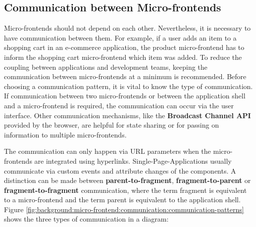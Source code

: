 \subsection{Communication between Micro-frontends}\label{subsection:background:micro-frontend:communication-patterns}

Micro-frontends should not depend on each other. Nevertheless, it is necessary to have communication between them. For example, if a user adds an item to a shopping cart in an e-commerce application, the product micro-frontend has to inform the shopping cart micro-frontend which item was added. To reduce the coupling between applications and development teams, keeping the communication between micro-frontends at a minimum is recommended. Before choosing a communication pattern, it is vital to know the type of communication. If communication between two micro-frontends or between the application shell and a micro-frontend is required, the communication can occur via the user interface. \cite{book:2020:geers:background:micro-frontends:micro-frontends-in-action} Other communication mechanisms, like the \textbf{Broadcast Channel \ac{API}} provided by the browser, are helpful for state sharing or for passing on information to multiple micro-frontends. \cite{misc:-:background:micro-frontends:broadcast-channel-api} 

\bigskip

\noindent The communication can only happen via URL parameters when the micro-frontends are integrated using hyperlinks. Single-Page-Applications usually communicate via custom events and attribute changes of the components. \cite[100]{book:2020:geers:background:micro-frontends:micro-frontends-in-action} \cite[315-316]{book:2019:farrell:background:micro-frontends:web-components-in-action} A distinction can be made between \textbf{parent-to-fragment}, \textbf{fragment-to-parent} or \textbf{fragment-to-fragment} communication, where the term fragment is equivalent to a micro-frontend and the term parent is equivalent to the application shell. \cite{book:2020:geers:background:micro-frontends:micro-frontends-in-action} Figure \ref{fig:background:micro-frontend:communication:communication-patterns} shows the three types of communication in a diagram:

